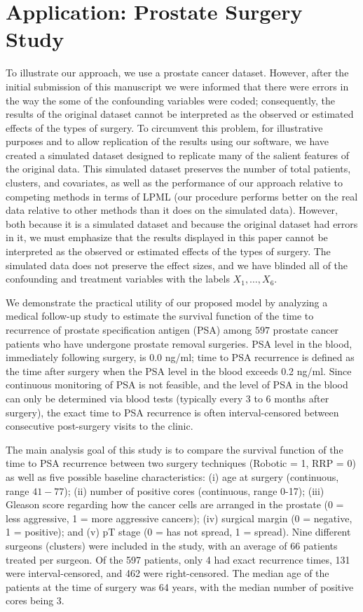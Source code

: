 \documentclass[11pt]{article}
\begin{document}
\section{Application: Prostate Surgery Study}
\label{s:sbart-psa_data_analysis}

To illustrate our approach,  we use a prostate cancer dataset.  However, after the initial submission of this manuscript we were informed that there were errors in the way the some of the confounding variables were coded; consequently, the results of the original dataset cannot be interpreted as the observed or estimated effects of the types of surgery.  To circumvent this problem, for illustrative purposes and to allow replication of the results using our software, we have created a simulated dataset designed to replicate many of the salient features of the original data. This simulated dataset preserves the number of total patients, clusters, and covariates, as well as the performance of our approach relative to competing methods in terms of LPML (our procedure performs better on the real data relative to other methods than it does on the simulated data).  However, both because it is a simulated dataset and because the original dataset had errors in it, we must emphasize that the results displayed in this paper cannot be interpreted as the observed or estimated effects of the types of surgery. The simulated data does not preserve the effect sizes, and we have blinded all of the confounding and treatment variables with the labels $X_1, \ldots, X_6$.

We demonstrate the practical utility of our proposed model by analyzing a medical follow-up study to estimate the survival function of the time to recurrence of prostate specification antigen (PSA) among $597$ prostate cancer patients who have undergone prostate removal surgeries. PSA level in the blood, immediately following surgery, is 0.0 ng/ml; time to PSA recurrence is defined as the time after surgery when the PSA level in the blood exceeds 0.2 ng/ml. Since continuous monitoring of PSA is not feasible, and the level of PSA in the blood can only be determined via blood tests (typically every 3 to 6 months after surgery), the exact time to PSA recurrence is often interval-censored between consecutive post-surgery visits to the clinic. 

The main analysis goal of this study is to compare the survival function of the time to PSA recurrence between two surgery techniques (Robotic = 1, RRP = 0) as well as five possible baseline characteristics: (i) age at surgery (continuous, range $41-77$); (ii) number of positive cores (continuous, range 0-17); (iii) Gleason score regarding how the cancer cells are arranged in the prostate (0 = less aggressive, 1 = more aggressive cancers); (iv) surgical margin (0 = negative, 1 = positive); and (v) pT stage (0 = has not spread, 1 = spread). Nine different surgeons (clusters) were included in the study, with an average of 66 patients treated per surgeon. Of the 597 patients, only 4 had exact recurrence times, 131 were interval-censored, and 462 were right-censored. The median age of the patients at the time of surgery was 64 years, with the median number of positive cores being 3.
\end{document}
